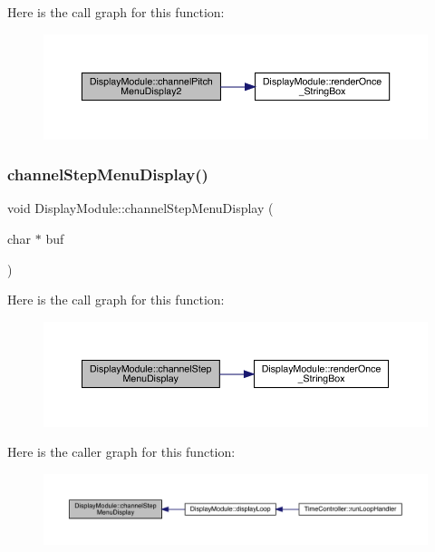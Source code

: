Here is the call graph for this function\+:
\nopagebreak
\begin{figure}[H]
\begin{center}
\leavevmode
\includegraphics[width=350pt]{class_display_module_a5e665571a41c10190dd2015489f87f3e_cgraph}
\end{center}
\end{figure}
\mbox{\label{class_display_module_ad5607972b28b5da028dda61cfe640638}} 
\subsubsection{\texorpdfstring{channel\+Step\+Menu\+Display()}{channelStepMenuDisplay()}}
{\footnotesize\ttfamily void Display\+Module\+::channel\+Step\+Menu\+Display (\begin{DoxyParamCaption}\item[{char $\ast$}]{buf }\end{DoxyParamCaption})}

Here is the call graph for this function\+:
\nopagebreak
\begin{figure}[H]
\begin{center}
\leavevmode
\includegraphics[width=350pt]{class_display_module_ad5607972b28b5da028dda61cfe640638_cgraph}
\end{center}
\end{figure}
Here is the caller graph for this function\+:
\nopagebreak
\begin{figure}[H]
\begin{center}
\leavevmode
\includegraphics[width=350pt]{class_display_module_ad5607972b28b5da028dda61cfe640638_icgraph}
\end{center}
\end{figure}
\mbox{\label{class_display_module_a579629d520ad24f721a25b9b1340516b}} 
